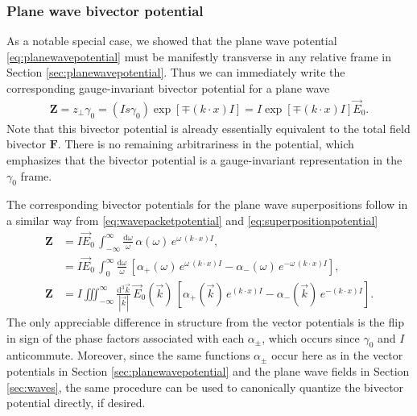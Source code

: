 \documentclass[1p,sort&compress]{elsarticle}
\numberwithin{equation}{section}
\newcommand{\rv}[1]{\vec{#1}}
\newcommand{\bv}[1]{\mathbf{#1}}
\begin{document}

\subsubsection{Plane wave bivector potential}


As a notable special case, we showed that the plane wave potential \eqref{eq:planewavepotential} must be manifestly transverse in any relative frame in Section \ref{sec:planewavepotential}.  Thus we can immediately write the corresponding gauge-invariant bivector potential for a plane wave
\begin{align}
  \bv{Z} = z_\perp\gamma_0 = (Is\gamma_0) \exp[\mp(k\cdot x)I] = I\exp[\mp(k\cdot x) I]\rv{E}_0.
\end{align}
Note that this bivector potential is already essentially equivalent to the total field bivector $\bv{F}$.  There is no remaining arbitrariness in the potential, which emphasizes that the bivector potential is a gauge-invariant representation in the $\gamma_0$ frame.

The corresponding bivector potentials for the plane wave superpositions follow in a similar way from \eqref{eq:wavepacketpotential} and \eqref{eq:superpositionpotential}
\begin{align}\label{eq:wavepacketbipotential}
  \bv{Z} &= I\rv{E}_0\, \int_{-\infty}^\infty \! \frac{\textrm{d}\omega}{\omega}\,\alpha(\omega)\,e^{\omega\,(k\cdot x) I}, \\
  &= I\rv{E}_0\, \int_0^\infty \! \frac{\textrm{d}\omega}{\omega}\,[\alpha_+(\omega)\,e^{\omega\,(k\cdot x) I} - \alpha_-(\omega)\,e^{-\omega\,(k\cdot x) I}], \nonumber \\
  \bv{Z} &= I\iiint_{-\infty}^\infty \! \frac{\textrm{d}^3\rv{k}}{|\rv{k}|}\,\rv{E}_0(\rv{k})\,[\alpha_+(\rv{k})\,e^{(k\cdot x) I} - \alpha_-(\rv{k})\,e^{-(k\cdot x) I}].
\end{align}
The only appreciable difference in structure from the vector potentials is the flip in sign of the phase factors associated with each $\alpha_\pm$, which occurs since $\gamma_0$ and $I$ anticommute.  Moreover, since the same functions $\alpha_\pm$ occur here as in the vector potentials in Section \ref{sec:planewavepotential} and the plane wave fields in Section \ref{sec:waves}, the same procedure can be used to canonically quantize the bivector potential directly, if desired.
\end{document}
